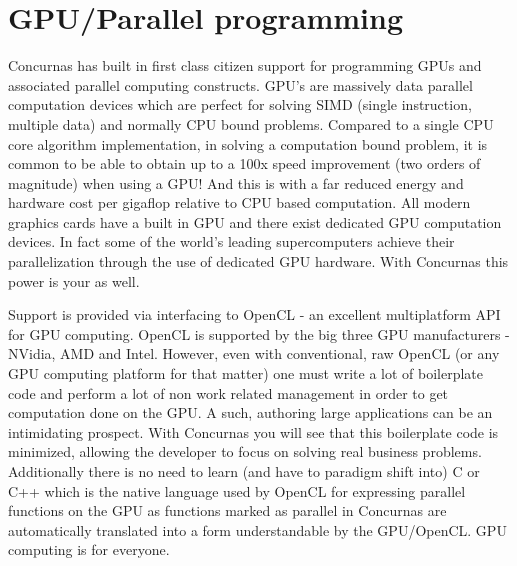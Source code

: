 \documentclass[conc-doc]{subfiles}
\begin{document}
	
	\chapter[GPU/Parallel programming]{GPU/Parallel programming}
	\label{ch:gpuprogramming}






Concurnas has built in first class citizen support for programming GPUs and associated parallel computing constructs. GPU's are massively data parallel computation devices which are perfect for solving SIMD (single instruction, multiple data) and normally CPU bound problems. Compared to a single CPU core algorithm implementation, in solving a computation bound problem, it is common to be able to obtain up to a 100x speed improvement (two orders of magnitude) when using a GPU! And this is with a far reduced energy and hardware cost per gigaflop relative to CPU based computation. All modern graphics cards have a built in GPU and there exist dedicated GPU computation devices. In fact some of the world's leading supercomputers achieve their parallelization through the use of dedicated GPU hardware. With Concurnas this power is your as well.

Support is provided via interfacing to OpenCL - an excellent multiplatform API for GPU computing. OpenCL is supported by the big three GPU manufacturers - NVidia, AMD and Intel. However, even with conventional, raw OpenCL (or any GPU computing platform for that matter) one must write a lot of boilerplate code and perform a lot of non work related management in order to get computation done on the GPU. A such, authoring large applications can be an intimidating prospect. With Concurnas you will see that this boilerplate code is minimized, allowing the developer to focus on solving real business problems. Additionally there is no need to learn (and have to paradigm shift into) C or C++ which is the native language used by OpenCL for expressing parallel functions on the GPU as functions marked as parallel in Concurnas are automatically translated into a form understandable by the GPU/OpenCL. GPU computing is for everyone.
\end{document}
